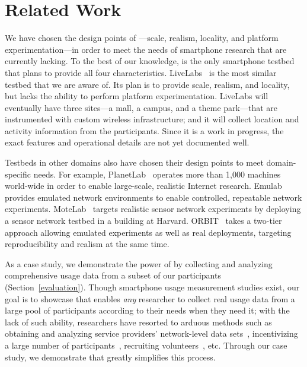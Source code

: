\section{Related Work}
\label{sec:related}

We have chosen the design points of \PhoneLab{}---scale, realism, locality, and
platform experimentation---in order to meet the needs of smartphone research
that are currently lacking. To the best of our knowledge, \PhoneLab{} is the
only smartphone testbed that plans to provide all four characteristics.
LiveLabs~\cite{livelabs} is the most similar testbed that we are aware of. Its
plan is to provide scale, realism, and locality, but lacks the ability to
perform platform experimentation. LiveLabs will eventually have three sites---a
mall, a campus, and a theme park---that are instrumented with custom wireless
infrastructure; and it will collect location and activity information from the
participants. Since it is a work in progress, the exact features and operational
details are not yet documented well.

Testbeds in other domains also have chosen their design points to meet
domain-specific needs. For example, PlanetLab~\cite{peterson:ccr:2003,
planetlab} operates more than 1,000 machines world-wide in order to enable
large-scale, realistic Internet research. Emulab~\cite{white:osdi:2002, emulab}
provides emulated network environments to enable controlled, repeatable
network experiments. MoteLab~\cite{werner-allen:ipsn:2005} targets realistic
sensor network experiments by deploying a sensor network testbed in a building
at Harvard. ORBIT~\cite{raychaudhuri:tridentcom:2005} takes a two-tier approach
allowing emulated experiments as well as real deployments, targeting
reproducibility and realism at the same time.

As a case study, we demonstrate the power of \PhoneLab{} by collecting and
analyzing comprehensive usage data from a subset of our participants
(Section~\ref{evaluation}). Though smartphone usage measurement studies exist,
our goal is to showcase that \PhoneLab{} enables \emph{any} researcher to
collect real usage data from a large pool of participants according to their
needs when they need it; with the lack of such ability, researchers have
resorted to arduous methods such as obtaining and analyzing service providers'
network-level data sets~\cite{xu:imc:2011, trestian:imc:2009,
trestian:ton:2012}, incentivizing a large number of
participants~\cite{falaki:mobisys:2010}, recruiting
volunteers~\cite{shye:micro:2009}, etc. Through our case study, we demonstrate
that \PhoneLab{} greatly simplifies this process.

